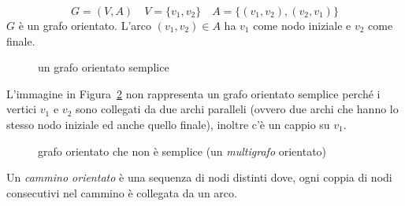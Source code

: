 \begin{ese}
\[ G=(V, A) \quad V = \{v_1, v_2\} \quad A = \{ (v_1, v_2), (v_2, v_1) \}\]
$G$ è un grafo orientato. L'arco $(v_1, v_2) \in A$ ha $v_1$ come nodo iniziale
e $v_2$ come finale.
    \begin{figure}[H]
    \centering
        \caption{un grafo orientato semplice}
        \label{fig:grf_or_non_semplice}
    \end{figure}
\QEDA
\end{ese}

\begin{ese}
L'immagine in Figura~\ref{fig:no_orientato_semplice} non rappresenta un grafo orientato semplice
perché i vertici $v_1$ e $v_2$ sono collegati da due archi paralleli 
(ovvero due archi che hanno lo stesso nodo iniziale ed anche quello finale), 
inoltre c'è un cappio su $v_1$.
    \begin{figure}[H] 
    \centering
        \caption{grafo orientato che non è semplice (un \emph{multigrafo} orientato)}
        \label{fig:no_orientato_semplice}
    \end{figure}
\QEDA
\end{ese}

\begin{defn}
Un \emph{cammino orientato} è una sequenza di nodi distinti dove, ogni coppia di nodi
consecutivi nel cammino è collegata da un arco.
\end{defn}

